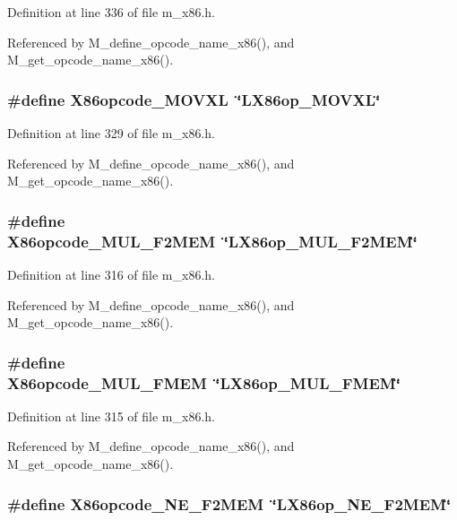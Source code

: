 Definition at line 336 of file m\_\-x86.h.

Referenced by M\_\-define\_\-opcode\_\-name\_\-x86(), and M\_\-get\_\-opcode\_\-name\_\-x86().
\subsubsection{\setlength{\rightskip}{0pt plus 5cm}\#define X86opcode\_\-MOVXL~\char`\"{}LX86op\_\-MOVXL\char`\"{}}\label{m__x86_8h_e31ffeef4d79068e11ae6d9c2d32e6c6}




Definition at line 329 of file m\_\-x86.h.

Referenced by M\_\-define\_\-opcode\_\-name\_\-x86(), and M\_\-get\_\-opcode\_\-name\_\-x86().
\subsubsection{\setlength{\rightskip}{0pt plus 5cm}\#define X86opcode\_\-MUL\_\-F2MEM~\char`\"{}LX86op\_\-MUL\_\-F2MEM\char`\"{}}\label{m__x86_8h_35a44171d49691d858e012853d929693}




Definition at line 316 of file m\_\-x86.h.

Referenced by M\_\-define\_\-opcode\_\-name\_\-x86(), and M\_\-get\_\-opcode\_\-name\_\-x86().
\subsubsection{\setlength{\rightskip}{0pt plus 5cm}\#define X86opcode\_\-MUL\_\-FMEM~\char`\"{}LX86op\_\-MUL\_\-FMEM\char`\"{}}\label{m__x86_8h_01378c72205457534d9f754058207ca3}




Definition at line 315 of file m\_\-x86.h.

Referenced by M\_\-define\_\-opcode\_\-name\_\-x86(), and M\_\-get\_\-opcode\_\-name\_\-x86().
\subsubsection{\setlength{\rightskip}{0pt plus 5cm}\#define X86opcode\_\-NE\_\-F2MEM~\char`\"{}LX86op\_\-NE\_\-F2MEM\char`\"{}}\label{m__x86_8h_75d26bb516f38cc8daf9d94fc60aeda5}




